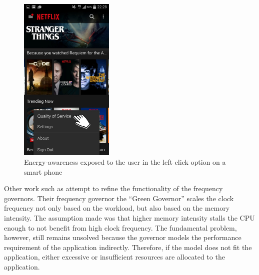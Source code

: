 \documentclass{article}
\begin{document}

\begin{figure}
  \begin{center}
    \vspace{-0.3cm}
    \includegraphics[width=4.5cm]{fig/netflix.png}
  \end{center}
  \caption{Energy-awareness exposed to the user in the left click option on a smart phone}
  \label{fig:netflix}
  \vspace{-0.5cm}
\end{figure}

Other work such as \cite{Spiliopoulos:11} attempt to refine the functionality of the frequency governors.
Their frequency governor the ``Green Governor'' scales the clock frequency not only based on the workload, but also based on the memory intensity.
The assumption made was that higher memory intensity stalls the CPU enough to not benefit from high clock frequency.
The fundamental problem, however, still remains unsolved because the governor models the performance requirement of the application indirectly.
Therefore, if the model does not fit the application, either excessive or insufficient resources are allocated to the application.\smallskip
\end{document}
